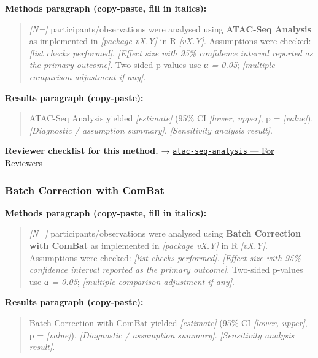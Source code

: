 \documentclass[
]{article}
\begin{document}
\textbf{Methods paragraph (copy-paste, fill in italics):}

\begin{quote}
\emph{{[}N={]}} participants/observations were analysed using
\textbf{ATAC-Seq Analysis} as implemented in \emph{{[}package vX.Y{]}}
in R \emph{{[}vX.Y{]}}. Assumptions were checked: \emph{{[}list checks
performed{]}}. \emph{{[}Effect size with 95\% confidence interval
reported as the primary outcome{]}}. Two-sided p-values use \emph{α =
0.05}; \emph{{[}multiple-comparison adjustment if any{]}}.
\end{quote}

\textbf{Results paragraph (copy-paste):}

\begin{quote}
ATAC-Seq Analysis yielded \emph{{[}estimate{]}} (95\% CI \emph{{[}lower,
upper{]}}, p = \emph{{[}value{]}}). \emph{{[}Diagnostic / assumption
summary{]}}. \emph{{[}Sensitivity analysis result{]}}.
\end{quote}

\textbf{Reviewer checklist for this method.} →
\href{../chapters/12-bioinformatics/atac-seq-analysis.Rmd\#for-reviewers}{\texttt{atac-seq-analysis}
--- For Reviewers}

\subsubsection{Batch Correction with
ComBat}\label{batch-correction-with-combat}

\textbf{Methods paragraph (copy-paste, fill in italics):}

\begin{quote}
\emph{{[}N={]}} participants/observations were analysed using
\textbf{Batch Correction with ComBat} as implemented in \emph{{[}package
vX.Y{]}} in R \emph{{[}vX.Y{]}}. Assumptions were checked: \emph{{[}list
checks performed{]}}. \emph{{[}Effect size with 95\% confidence interval
reported as the primary outcome{]}}. Two-sided p-values use \emph{α =
0.05}; \emph{{[}multiple-comparison adjustment if any{]}}.
\end{quote}

\textbf{Results paragraph (copy-paste):}

\begin{quote}
Batch Correction with ComBat yielded \emph{{[}estimate{]}} (95\% CI
\emph{{[}lower, upper{]}}, p = \emph{{[}value{]}}). \emph{{[}Diagnostic
/ assumption summary{]}}. \emph{{[}Sensitivity analysis result{]}}.
\end{quote}
\end{document}
